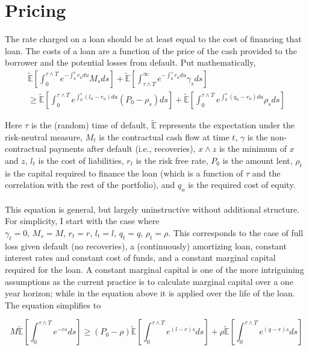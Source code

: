 \documentclass{article}
\begin{document}




\section{Pricing}


The rate charged on a loan should be at least equal to the cost of financing that loan.  The costs of a loan are a function of the price of the cash provided to the borrower and the potential losses from default.  Put mathematically, 
\begin{align*}
\mathbb{\tilde{E}}\left[ \int_0 ^ {\tau \wedge T} e^{-\int_0 ^ s r_u du} M_s ds \right]+\mathbb{\tilde{E}}\left[ \int_{\tau \wedge T} ^ \infty e^{-\int_0 ^ s r_u du} \gamma_s ds \right]\\ \geq 
\mathbb{\tilde{E}}\left[ \int_0 ^ {\tau \wedge T} e^{\int _ 0 ^ s \left(l_u-r_u \right) du} \left(P_0-\rho_s\right) ds \right]
+\mathbb{\tilde{E}}\left[ \int_0 ^ {\tau \wedge T} e^{\int _ 0 ^ s \left(q_u-r_u \right) du} \rho_s ds \right]
\end{align*}

Here \(\tau\) is the (random) time of default, \(\mathbb{\tilde{E}}\) represents the expectation under the risk-neutral measure, \(M_t\) is the contractual cash flow at time \(t\), \(\gamma\) is the non-contractual payments after default (i.e., recoveries), \(x \wedge z\) is the minimum of \(x\) and \(z\), \(l_t\) is the cost of liabilities, \(r_t\) is the risk free rate, \(P_0\) is the amount lent, \(\rho_t\) is the capital required to finance the loan (which is a function of \(\tau\) and the correlation with the rest of the portfolio), and \(q_u\) is the required cost of equity.
\\
\\
This equation is general, but largely uninstructive without additional structure.  For simplicity, I start with the case where \(\gamma_t = 0,\,M_s=M,\,r_t=r,\,l_t=l,\,q_t=q,\, \rho_t=\rho\).  This corresponds to the case of full loss given default (no recoveries), a (continuously) amortizing loan, constant interest rates and constant cost of funds, and a constant marginal capital required for the loan.  A constant marginal capital is one of the more intriguining assumptions as the current practice is to calculate marginal capital over a one year horizon; while in the equation above it is applied over the life of the loan.  The equation simplifies to

\[
M\mathbb{\tilde{E}}\left[ \int_0 ^ {\tau \wedge T} e^{-rs} ds \right]  \geq 
\left(P_0-\rho \right)\mathbb{\tilde{E}}\left[ \int_0 ^ {\tau \wedge T} e^{(l-r)s}  ds \right]
+\rho\mathbb{\tilde{E}}\left[ \int_0 ^ {\tau \wedge T} e^{(q-r)s} ds \right]
\]
\end{document}
